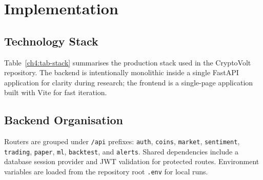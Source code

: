 \chapter{Implementation}\label{ch4}

\section{Technology Stack}
Table~\ref{ch4:tab-stack} summarises the production stack used in the CryptoVolt repository. The backend is intentionally monolithic inside a single FastAPI application for clarity during research; the frontend is a single-page application built with Vite for fast iteration.

\begin{table}[ht]
\centering
\caption{Major technologies in the implemented system.}
\label{ch4:tab-stack}
\end{table}

\section{Backend Organisation}
Routers are grouped under \texttt{/api} prefixes: \texttt{auth}, \texttt{coins}, \texttt{market}, \texttt{sentiment}, \texttt{trading}, \texttt{paper}, \texttt{ml}, \texttt{backtest}, and \texttt{alerts}. Shared dependencies include a database session provider and JWT validation for protected routes. Environment variables are loaded from the repository root \texttt{.env} for local runs.

